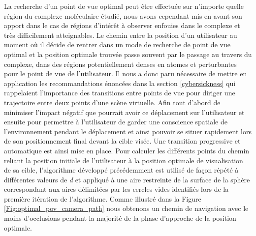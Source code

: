 La recherche d'un point de vue optimal peut être effectuée sur n'importe quelle région du complexe moléculaire étudié, nous avons cependant mis en avant son apport dans le cas de régions d'intérêt à observer enfouies dans le complexe et très difficilement atteignables. Le chemin entre la position d'un utilisateur au moment où il décide de rentrer dans un mode de recherche de point de vue optimal et la position optimale trouvée passe souvent par le passage au travers du complexe, dans des régions potentiellement denses en atomes et perturbantes pour le point de vue de l'utilisateur. Il nous a donc paru nécessaire de mettre en application les recommandations énoncées dans la section \ref{cybersickness} qui rappelaient l'importance des transitions entre points de vue pour diriger une trajectoire entre deux points d'une scène virtuelle. Afin tout d'abord de minimiser l'impact négatif que pourrait avoir ce déplacement sur l'utilisateur et ensuite pour permettre à l'utilisateur de garder une conscience spatiale de l'environnement pendant le déplacement et ainsi pouvoir se situer rapidement lors de son positionnement final devant la cible visée.
Une transition progressive et automatique est ainsi mise en place. Pour calculer les différents points du chemin reliant la position initiale de l'utilisateur à la position optimale de visualisation de sa cible, l'algorithme développé précédemment est utilisé de façon répété à différentes valeurs de \textit{d} et appliqué à une aire restreinte de la surface de la sphère correspondant aux aires délimitées par les cercles vides identifiés lors de la première itération de l'algorithme. Comme illustré dans la Figure \ref{Fig:optimal_pov_camera_path} nous obtenons un chemin de navigation avec le moins d'occlusions pendant la majorité de la phase d'approche de la position optimale.

